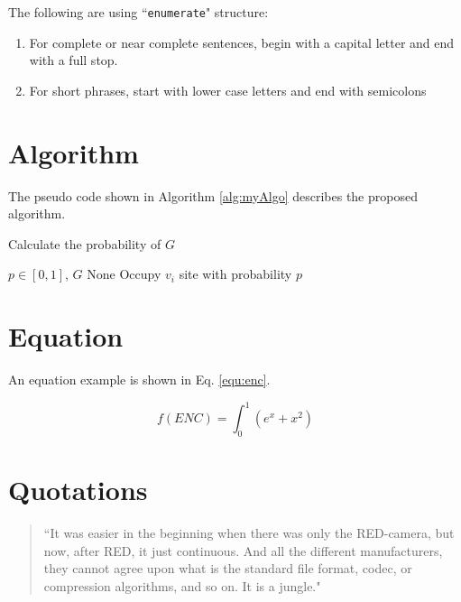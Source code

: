 The following are using ``\texttt{enumerate}" structure:

\begin{enumerate}

    \item For complete or near complete sentences, begin with a capital letter and end with a full stop.
    \item For short phrases, start with lower case letters and end with semicolons

\end{enumerate}


\section{Algorithm}

The pseudo code shown in Algorithm \ref{alg:myAlgo} describes the proposed algorithm.

\begin{algorithm}
\small{
    \caption{Calculate the probability of $G$}
    \label{alg:myAlgo}
    \begin{algorithmic} [1]
        \Require $p \in [0,1]$, $G$
        \Ensure None
                  
                    \State Occupy $v_i$ site with probability $p$
                \EndIf
            \EndIf
        \EndFor
    \end{algorithmic}}
\end{algorithm}

\section{Equation}
\label{section:equation}

An equation example is shown in Eq. \ref{equ:enc}.

\begin{equation}
\label{equ:enc}
f(ENC)=\int_0^{1}(e^{x}+x^{2})
\end{equation}

\section{Quotations}
\label{subSec:quotation}

\begin{quote}
``It was easier in the beginning when there was only the RED-camera, but now, after RED, it just continuous. And all the different manufacturers, they cannot agree upon what is the standard file format, codec, or compression algorithms, and so on. It is a jungle."
\end{quote}

